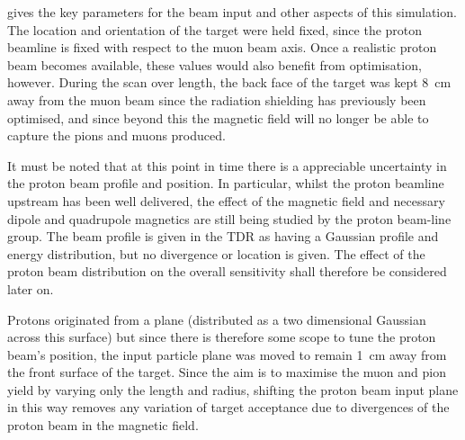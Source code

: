  gives the key parameters for the
beam input and other aspects of this simulation.  The location and orientation
of the target were held fixed, since the proton beamline is fixed with respect
to the muon beam axis.  Once a realistic proton beam becomes available, these
values would also benefit from optimisation, however.  During the scan over
length, the back face of the target was kept 8~cm away from the muon beam since
the radiation shielding has previously been optimised, and since beyond this
the magnetic field will no longer be able to capture the pions and muons
produced.

It must be noted that at this point in time there is a appreciable
uncertainty in the proton beam profile and position.  In particular, whilst the
proton beamline upstream has been well delivered, the effect of the magnetic
field and necessary dipole and quadrupole magnetics are still being studied by
the proton beam-line group.  The beam profile is given in the \phaseI \ac{TDR}
as having a Gaussian profile and energy distribution, but no divergence or
location is given.  The effect of the proton beam distribution on the overall
sensitivity shall therefore be considered later on.

Protons originated from a plane (distributed as a two dimensional Gaussian
across this surface) but since there is therefore some scope to tune the proton
beam's position, the input particle plane was moved to remain 1~cm away from
the front surface of the target.  Since the aim is to maximise the muon and
pion yield by varying only the length and radius, shifting the proton beam
input plane in this way removes any variation of target acceptance due to
divergences of the proton beam in the magnetic field.

